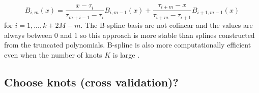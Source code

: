 \documentclass{article}
\begin{document}
\begin{equation}
B_{i,m}(x) = \frac{x-\tau_i}{\tau_{m+i-1}-\tau_i}B_{i,m-1}(x) + \frac{\tau_{i+m}-x}{\tau_{i+m}-\tau_{i+1}}B_{i+1,m-1}(x)
\end{equation}
for $i=1,...,k+2M-m$.
The B-spline basis are not colinear and the values are always between $0$ and $1$ so this approach is more stable than splines constructed from the truncated polynomials. B-spline is also more computationally efficient even when the number of knots $K$ is large \cite{friedman2001elements}.



\subsection{Choose knots (cross validation)?}

 

\end{document}
